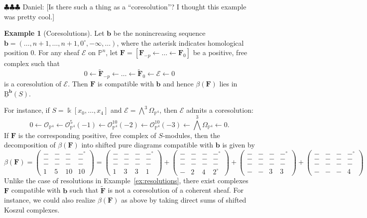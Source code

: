 \documentclass[12pt]{amsart}
\theoremstyle{definition}
\newtheorem{example}[lemma]{Example}
\theoremstyle{remark}
\newcommand{\kk}{\Bbbk}
\newcommand{\PP}{\mathbb{P}}
\newcommand{\bb}{\mathbf{b}}
\newcommand{\cO}{\mathcal{O}}
\newcommand{\cE}{\mathcal{E}}
\newcommand{\FF}{\mathbf{F}}
\newcommand{\zp}{\circ}
\newcommand{\BBQ}{\underline{\mathrm{B}}}
\newcommand{\daniel}[1]{{\color{green} \sf $\clubsuit\clubsuit\clubsuit$ Daniel: [#1]}}
\begin{document}
\daniel{Is there such a thing as a ``coresolution''?  I thought this example was pretty cool.}
\begin{example}[Coresolutions]\label{ex:coresolutions}
Let $\bb$ be the nonincreasing sequence $\bb=(\dots, n+1, \dots, n+1, 0^\zp,-\infty, \dots)$, where the asterisk indicates homological position $0$.  For any sheaf $\cE$ on $\PP^n$, let $\FF=[\FF_{-p}\gets \dots \gets \FF_0]$ be a positive, free complex such that 
\[
0\gets \widetilde{\FF}_{-p}\gets \dots \gets \widetilde{\FF}_0\gets \cE\gets 0
\]
is a coresolution of $\cE$.  Then $\FF$ is compatible with $\bb$ and hence $\beta(\FF)$ lies in $\BBQ^{\bb}(S)$.  

For instance, if $S=\kk[x_0, \dots, x_4]$ and $\cE=\bigwedge^3 \Omega_{\PP^4}$, then $\cE$ admits a coresolution:
\[
0\gets \cO_{\PP^4}\gets  \cO_{\PP^4}^5(-1)\gets  \cO_{\PP^4}^{10}(-2)\gets  \cO_{\PP^4}^{10}(-3)\gets \bigwedge^3 \Omega_{\PP^4}\gets 0.
\]
If $\FF$ is the corresponding positive, free complex of $S$-modules, then the decomposition of $\beta(\FF)$ into shifted pure diagrams compatible with $\bb$ is given by
\[
\beta(\FF)=\left(\begin{smallmatrix}-&-&-&-^\zp\\
-&-&-&-\\
-&-&-&-\\
1&5&10&10
\end{smallmatrix}\right)
=\left(\begin{smallmatrix}
-&-&-&-^\zp\\
-&-&-&-\\
-&-&-&-\\1&3&3&1
\end{smallmatrix}\right)
+
\left(\begin{smallmatrix}
-&-&-&-^\zp\\
-&-&-&-\\
-&-&-&-\\-&2&4&2^\zp
\end{smallmatrix}\right)
+
\left(\begin{smallmatrix}
-&-&-&-^\zp\\
-&-&-&-\\
-&-&-&-\\
-&-&3&3
\end{smallmatrix}\right)
+
\left(\begin{smallmatrix}
-&-&-&-^\zp\\
-&-&-&-\\
-&-&-&-\\
-&-&-&4
\end{smallmatrix}\right)
\]
Unlike the case of resolutions in Example~\ref{ex:resolutions}, there exist complexes $\FF$ compatible with $\bb$ such that $\widetilde{\FF}$ is not a coresolution of a coherent sheaf.  For instance, we could also realize $\beta(\FF)$ as above by taking direct sums of shifted Koszul complexes.
\end{example}
\end{document}
